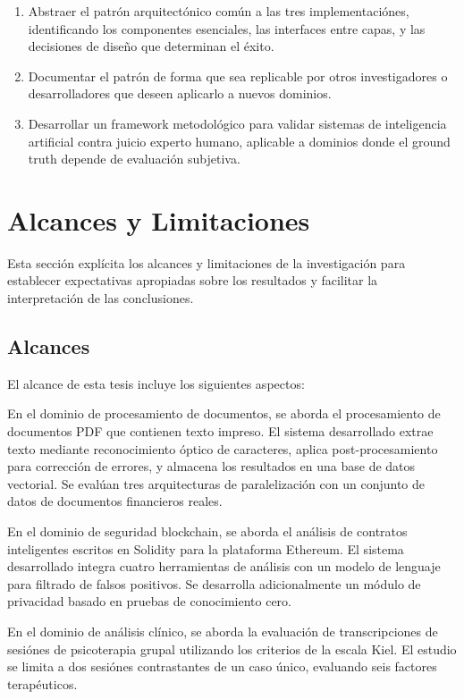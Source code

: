 \documentclass[12pt,a4paper,twoside]{book}
\begin{document}
\begin{enumerate}[label=\textbf{OE4.\arabic*.}]
    \item Abstraer el patrón arquitectónico común a las tres implementaciónes, identificando los componentes esenciales, las interfaces entre capas, y las decisiones de diseño que determinan el éxito.
    
    \item Documentar el patrón de forma que sea replicable por otros investigadores o desarrolladores que deseen aplicarlo a nuevos dominios.
    
    \item Desarrollar un framework metodológico para validar sistemas de inteligencia artificial contra juicio experto humano, aplicable a dominios donde el ground truth depende de evaluación subjetiva.
\end{enumerate}

\section{Alcances y Limitaciones}

Esta sección explícita los alcances y limitaciones de la investigación para establecer expectativas apropiadas sobre los resultados y facilitar la interpretación de las conclusiones.

\subsection{Alcances}

El alcance de esta tesis incluye los siguientes aspectos:

En el dominio de procesamiento de documentos, se aborda el procesamiento de documentos PDF que contienen texto impreso. El sistema desarrollado extrae texto mediante reconocimiento óptico de caracteres, aplica post-procesamiento para corrección de errores, y almacena los resultados en una base de datos vectorial. Se evalúan tres arquitecturas de paralelización con un conjunto de datos de documentos financieros reales.

En el dominio de seguridad blockchain, se aborda el análisis de contratos inteligentes escritos en Solidity para la plataforma Ethereum. El sistema desarrollado integra cuatro herramientas de análisis con un modelo de lenguaje para filtrado de falsos positivos. Se desarrolla adicionalmente un módulo de privacidad basado en pruebas de conocimiento cero.

En el dominio de análisis clínico, se aborda la evaluación de transcripciones de sesiónes de psicoterapia grupal utilizando los criterios de la escala Kiel. El estudio se limita a dos sesiónes contrastantes de un caso único, evaluando seis factores terapéuticos.
\end{document}
